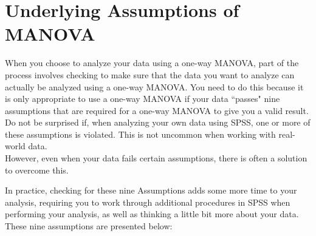 \documentclass[a4paper,12pt]{article}
\begin{document}
\section{Underlying Assumptions of MANOVA}
When you choose to analyze your data using a one-way MANOVA, part of the process involves checking to make sure that the data you want to analyze can actually be analyzed using a one-way MANOVA. You need to do this because it is only appropriate to use a one-way MANOVA if your data ``passes" nine assumptions that are required for a one-way MANOVA to give you a valid result. \\ Do not be surprised if, when analyzing your own data using SPSS, one or more of these assumptions is violated. This is not uncommon when working with real-world data.\\ However, even when your data fails certain assumptions, there is often a solution to overcome this.

In practice, checking for these nine Assumptions adds some more time to your analysis, requiring you to work through additional procedures in SPSS when performing your analysis, as well as thinking a little bit more about your data. These nine assumptions are presented below:
\end{document}
